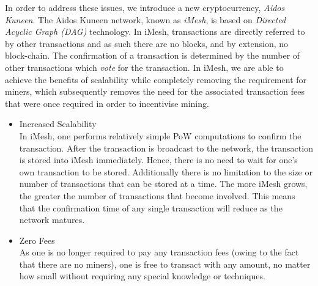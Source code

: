 \documentclass[a4paper,10pt,twocolumn]{article}
\begin{document}
In order to address these issues, we introduce a new cryptocurrency, \emph{Aidos Kuneen}.
The Aidos Kuneen network, known as \emph{iMesh}, is based on \emph{Directed Acyclic Graph (DAG)} technology.
In iMesh, transactions are directly referred to by other transactions and as such there are no blocks, and by extension, no block-chain.
The confirmation of a transaction is determined by the number of other transactions which \emph{vote} for the transaction. In iMesh, we are able to achieve the benefits of scalability while completely removing the requirement for miners, which subsequently removes the need for the associated transaction fees that were once required in order to incentivise mining.
\vspace{-0.5\baselineskip}
\begin{itemize}
	\setlength\itemsep{0em}
	\item{Increased Scalability}\mbox{}\\ 
In iMesh, one performs relatively simple PoW computations to confirm the transaction. After the transaction is broadcast to the network,
the transaction is stored into iMesh immediately. Hence, there is no need to wait for one's own transaction to be stored. Additionally 
there is no limitation to the size or number of transactions that can be stored at a time. The more iMesh grows, the greater the number 
of transactions that become involved. This means that the confirmation time of any single transaction will reduce as the network matures.

\item{Zero Fees}\mbox{}\\ 
As one is no longer required to pay any transaction fees (owing to the fact that there are no miners), one is free to 
transact with any amount, no matter how small without requiring any special knowledge or techniques.


\end{itemize}
\end{document}
